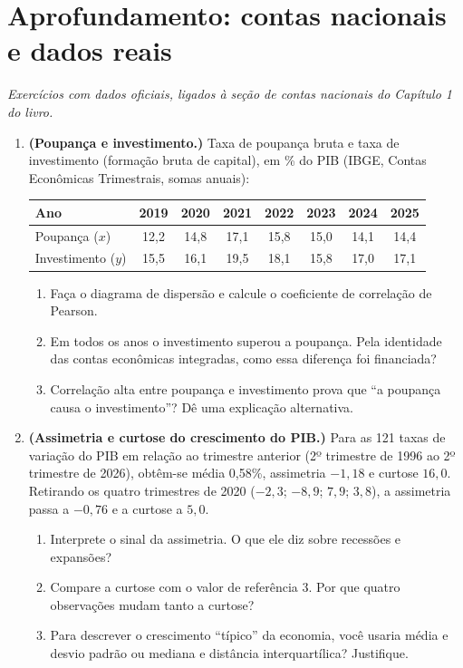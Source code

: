 \documentclass[11pt]{article}
\begin{document}
\bigskip
{}
\section*{Aprofundamento: contas nacionais e dados reais}
\noindent\textit{Exercícios com dados oficiais, ligados à seção de contas nacionais do Capítulo 1 do livro.}

\begin{enumerate}[label=\textbf{A\arabic*.}, leftmargin=*]
\item \textbf{(Poupança e investimento.)} Taxa de poupança bruta e taxa de investimento (formação bruta de capital), em \% do PIB
(IBGE, Contas Econômicas Trimestrais, somas anuais):
\begin{center}
\begin{tabular}{lccccccc}
\toprule
Ano & 2019 & 2020 & 2021 & 2022 & 2023 & 2024 & 2025 \\
\midrule
Poupança ($x$) & 12,2 & 14,8 & 17,1 & 15,8 & 15,0 & 14,1 & 14,4 \\
Investimento ($y$) & 15,5 & 16,1 & 19,5 & 18,1 & 15,8 & 17,0 & 17,1 \\
\bottomrule
\end{tabular}
\end{center}
\begin{enumerate}[label=(\alph*)]
  \item Faça o diagrama de dispersão e calcule o coeficiente de correlação de Pearson.
  \item Em todos os anos o investimento superou a poupança. Pela identidade das contas econômicas integradas, como essa diferença foi financiada?
  \item Correlação alta entre poupança e investimento prova que ``a poupança causa o investimento''? Dê uma explicação alternativa.
\end{enumerate}

\item \textbf{(Assimetria e curtose do crescimento do PIB.)} Para as 121 taxas de variação do PIB em relação ao trimestre anterior (2º trimestre de 1996 ao
2º trimestre de 2026), obtêm-se média 0,58\%, assimetria $-1{,}18$ e curtose $16{,}0$. Retirando os quatro trimestres de 2020 ($-2{,}3$; $-8{,}9$; $7{,}9$; $3{,}8$),
a assimetria passa a $-0{,}76$ e a curtose a $5{,}0$.
\begin{enumerate}[label=(\alph*)]
  \item Interprete o sinal da assimetria. O que ele diz sobre recessões e expansões?
  \item Compare a curtose com o valor de referência 3. Por que quatro observações mudam tanto a curtose?
  \item Para descrever o crescimento ``típico'' da economia, você usaria média e desvio padrão ou mediana e distância interquartílica? Justifique.
\end{enumerate}

\end{enumerate}
\end{document}
